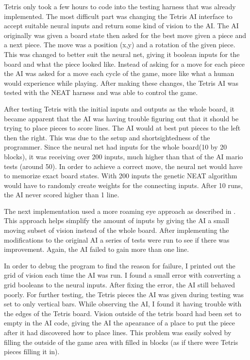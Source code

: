 \documentclass[12pt]{ucthesis} \newif\ifpdf \ifx\pdfoutput\undefined
\begin{document}
Tetris only took a few hours to code into the testing harness that was already
implemented. The most difficult part was changing the Tetris AI interface to
accept suitable neural inputs and return some kind of vision to the AI. The AI
originally was given a board state then asked for the best move given a piece
and a next piece. The move was a position (x,y) and a rotation of the given
piece. This was changed to better suit the neural net, giving it boolean inputs
for the board and what the piece looked like. Instead of asking for a move for
each piece the AI was asked for a move each cycle of the game, more like what a
human would experience while playing. After making these changes, the Tetris AI
was tested with the NEAT harness and was able to control the game.

After testing Tetris with the initial inputs and outputs as the whole board, it
became apparent that the AI was having trouble figuring out that it should be
trying to place pieces to score lines. The AI would at best put pieces to the
left then the right. This was due to the setup and shortsightedness of the
programmer. Since the neural net had inputs for the whole board(10 by 20
blocks), it was receiving over 200 inputs, much higher than that of the AI mario
tests (around 50). In order to achieve a correct move, the neural net would have
to memorize exact board states. With 200 inputs the genetic NEAT algorithm would
have to randomly create weights for the connecting inputs. After 10 runs, the AI
never scored higher than 1 line.

The next implementation used a more roaming eye approach as described in
\cite{stanley:phd04}. This approach helps simplify the amount of inputs by
giving the AI a small moving subset of vision instead of the whole board. After
implementing the modifications to the original AI a series of tests were run to
see if there was improvement. Again, the AI failed to gain more than one line.

In order to debug the program to find the reason for failure, I printed out the
grid of vision each time the AI was run. I found a small error with converting a
grid booleans to the neural inputs. After fixing the error, the AI still behaved
poorly. For further testing, the Tetris pieces the AI was given during testing
was set to only vertical bars. While observing the AI, I found it having trouble
with the edges of the Tetris board. Vision outside of the tetris board had been
set to empty in the AI code, giving the AI the apearance of a place to put the
piece after it had discovered how to place lines. This problem was easily solved
by filling the outside of the game area with filled in blocks (as if there were
Tetris pieces filling it in).
\end{document}
